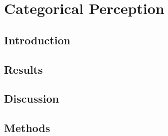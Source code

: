 \chapter{Categorical Perception}
\section{Introduction}


\section{Results}


\section{Discussion}


\section{Methods}
